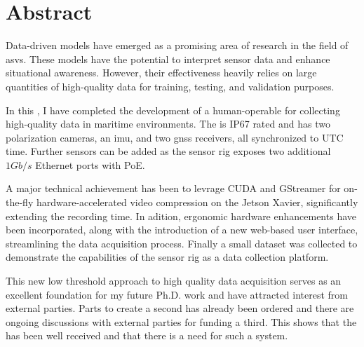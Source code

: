 \chapter*{Abstract}

Data-driven models have emerged as a promising area of research in the field of \glspl{asv}.
These models have the potential to interpret sensor data and enhance situational awareness.
However, their effectiveness heavily relies on large quantities of high-quality data for training, testing, and validation purposes.

In this \master, I have completed the development of a human-operable \sr for collecting high-quality data in maritime environments.
The \sr is IP67 rated and has two polarization cameras, an \gls{imu}, and two \gls{gnss} receivers, all synchronized to UTC time.
Further sensors can be added as the sensor rig exposes two additional $1Gb/s$ Ethernet ports with PoE.

A major technical achievement has been to levrage CUDA and GStreamer for on-the-fly hardware-accelerated video compression on the Jetson Xavier, significantly extending the recording time.
In adition, ergonomic hardware enhancements have been incorporated, along with the introduction of a new web-based user interface, streamlining the data acquisition process.
Finally a small dataset was collected to demonstrate the capabilities of the sensor rig as a data collection platform.

This new low threshold approach to high quality data acquisition serves as an excellent foundation for my future Ph.D. work and have attracted interest from external parties.
Parts to create a second \sr has already been ordered and there are ongoing discussions with external parties for funding a third.
This shows that the \sr has been well received and that there is a need for such a system.

